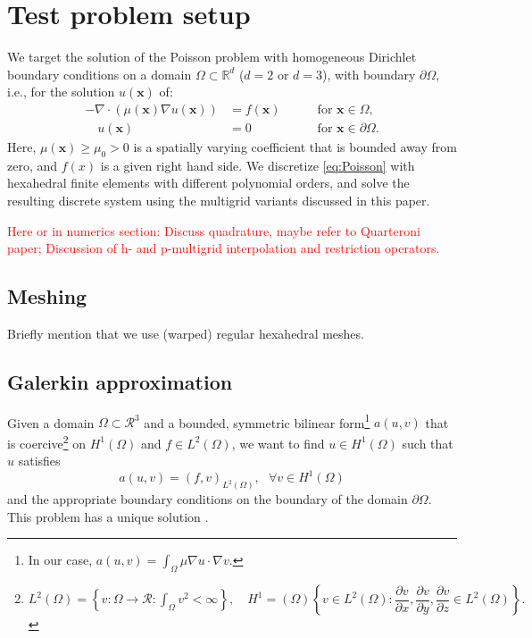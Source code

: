 \documentclass[smallcondensed,final]{svjour3}     %
\newcommand{\todo}[1]{\textcolor{red}{ #1}}
\newcommand{\bs}[1]{\ensuremath{\boldsymbol #1}}
\begin{document}
\section{Test problem setup}
\label{sec:problem}

We target the solution of the Poisson problem with
homogeneous Dirichlet boundary conditions on a domain
$\Omega\subset\mathbb R^d$ ($d=2$ or $d=3$), with boundary $\partial
\Omega$, i.e., for the solution $u(\bs x)$ of:
\begin{equation}\label{eq:Poisson}
  \begin{aligned}
    -\nabla\cdot\left(\mu(\bs x)\nabla u(\bs x)\right) &= f(\bs x) \quad &&\text{ for } \bs x\in \Omega,\\
    \quad u(\bs x)& = 0  \quad &&\text{ for } \bs x\in \partial\Omega.
  \end{aligned}
\end{equation}
Here, $\mu(\bs x)\ge \mu_0>0$ is a spatially varying coefficient that
is bounded away from zero, and $f(x)$ is a given right hand side. We
discretize \eqref{eq:Poisson} with hexahedral finite elements with
different polynomial orders, and solve the resulting discrete system
using the multigrid variants discussed in this paper.

\todo{Here or in numerics section: Discuss quadrature, maybe refer to
  Quarteroni paper; Discussion of h- and p-multigrid interpolation and
  restriction operators.}

\subsection{Meshing} %
\label{sub:meshing}

Briefly mention that we use (warped) regular hexahedral meshes.


\subsection{Galerkin approximation} 

Given a domain $\Omega \subset \mathcal{R}^3$ and a bounded, symmetric bilinear form\footnote{In our case, $a(u,v)=\int_\Omega \mu\nabla u \cdot \nabla v$.} $a(u,v)$ that is coercive\footnote{$L^{2}(\Omega)=\left\{ v:\Omega\rightarrow\mathcal{R} : \int_\Omega v^2 < \infty \right\}, \quad H^{1}=(\Omega) \left\{ v \in L^{2}(\Omega) : \dfrac{\partial v}{\partial x},\dfrac{\partial v}{\partial y},\dfrac{\partial v}{\partial z} \in L^{2}(\Omega)\right\}. $} on $H^{1}(\Omega)$
and $f \in L^{2}(\Omega)$, we want to find $u \in H^{1}(\Omega)$ such that $u$ satisfies
\begin{equation}
\label{eqn:weakForm}
a(u,v) = (f,v)_{L^2(\Omega)}, \ \ \ \forall v \in H^{1}(\Omega)
\end{equation}
and the appropriate boundary conditions on the boundary of the domain  $\partial \Omega$. This problem has a unique solution \cite{BrennerScott94}. 
\end{document}
